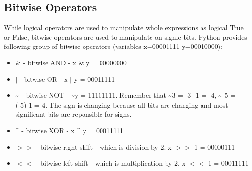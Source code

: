 \documentclass{article}
\begin{document}
	\subsection{Bitwise Operators}
	While logical operators are used to manipulate whole expressions as logical True or False, bitwise operators are used to manipulate on signle bits. Python provides following group of bitwise operators (variables x=00001111 y=00010000):
	\begin{itemize}
	\item $\&$ - bitwise AND - x \& y = 00000000
	\item $|$ - bitwise OR - x $|$ y = 00011111
	\item \~{} - bitwise NOT - \~{}y = 11101111. Remember that \~{}3 = -3 -1 = -4, \~{}-5 = -(-5)-1 = 4. The sign is changing because all bits are changing and most significant bits are reponsible for signs.
	\item \^{} - bitwise XOR - x \^{} y = 00011111
	\item $>>$ - bitwise right shift - which is division by 2. x $>>$ 1 = 00000111
	\item $<<$ - bitwise left shift - which is multiplication by 2. x $<<$ 1 = 00011111 
	\end{itemize}	 		

	\newpage
\end{document}

